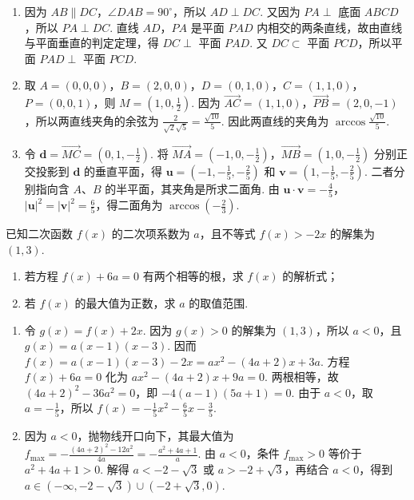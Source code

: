 \begin{solution}
\begin{enumerate}
\item 因为 \(AB\parallel DC\)，\(\angle DAB=90^{\circ}\)，所以 \(AD\perp DC\). 又因为 \(PA\perp\) 底面 \(ABCD\)，所以 \(PA\perp DC\). 直线 \(AD\)，\(PA\) 是平面 \(PAD\) 内相交的两条直线，故由直线与平面垂直的判定定理，得 \(DC\perp\) 平面 \(PAD\). 又 \(DC\subset\) 平面 \(PCD\)，所以平面 \(PAD\perp\) 平面 \(PCD\).
\item 取 \(A=(0,0,0)\)，\(B=(2,0,0)\)，\(D=(0,1,0)\)，\(C=(1,1,0)\)，\(P=(0,0,1)\)，则 \(M=(1,0,\frac12)\). 因为 \(\overrightarrow{AC}=(1,1,0)\)，\(\overrightarrow{PB}=(2,0,-1)\)，所以两直线夹角的余弦为 \(\frac{2}{\sqrt2\sqrt5}=\frac{\sqrt{10}}5\). 因此两直线的夹角为 \(\arccos\frac{\sqrt{10}}5\).
\item 令 \(\mathbf{d}=\overrightarrow{MC}=(0,1,-\frac12)\). 将 \(\overrightarrow{MA}=(-1,0,-\frac12)\)，\(\overrightarrow{MB}=(1,0,-\frac12)\) 分别正交投影到 \(\mathbf{d}\) 的垂直平面，得 \(\mathbf{u}=(-1,-\frac15,-\frac25)\) 和 \(\mathbf{v}=(1,-\frac15,-\frac25)\). 二者分别指向含 \(A\)、\(B\) 的半平面，其夹角是所求二面角. 由 \(\mathbf{u}\cdot\mathbf{v}=-\frac45\)，\(\lvert\mathbf{u}\rvert^2=\lvert\mathbf{v}\rvert^2=\frac65\)，得二面角为 \(\arccos(-\frac23)\).
\end{enumerate}
\end{solution}

\begin{problem}
已知二次函数 \(f(x)\) 的二次项系数为 \(a\)，且不等式 \(f(x)>-2x\) 的解集为 \((1,3)\).

\begin{enumerate}
\item 若方程 \(f(x)+6a=0\) 有两个相等的根，求 \(f(x)\) 的解析式；
\item 若 \(f(x)\) 的最大值为正数，求 \(a\) 的取值范围.
\end{enumerate}
\end{problem}

\begin{solution}
\begin{enumerate}
\item 令 \(g(x)=f(x)+2x\). 因为 \(g(x)>0\) 的解集为 \((1,3)\)，所以 \(a<0\)，且 \(g(x)=a(x-1)(x-3)\). 因而 \(f(x)=a(x-1)(x-3)-2x=ax^{2}-(4a+2)x+3a\). 方程 \(f(x)+6a=0\) 化为 \(ax^{2}-(4a+2)x+9a=0\). 两根相等，故
\(\left(4a+2\right)^{2}-36a^{2}=0\)，即 \(-4(a-1)(5a+1)=0\).  由于 \(a<0\)，取 \(a=-\frac{1}{5}\)，所以 \(f(x)=-\frac{1}{5}x^{2}-\frac{6}{5}x-\frac{3}{5}\).
\item 因为 \(a<0\)，抛物线开口向下，其最大值为
\(f_{\max}=-\frac{(4a+2)^{2}-12a^{2}}{4a}=-\frac{a^{2}+4a+1}{a}\).  由 \(a<0\)，条件 \(f_{\max}>0\) 等价于 \(a^{2}+4a+1>0\).  解得 \(a<-2-\sqrt{3}\) 或 \(a>-2+\sqrt{3}\)，再结合 \(a<0\)，得到 \(a\in(-\infty,-2-\sqrt{3})\cup(-2+\sqrt{3},0)\).
\end{enumerate}
\end{solution}


